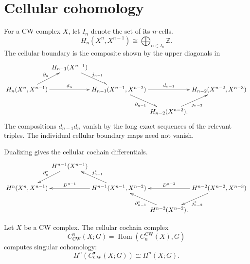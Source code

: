 \section{Cellular cohomology}
\label{at-section-cellular-cohomology}

\noindent
For a CW complex $X$,
let $I_n$ denote the set of its $n$-cells.
$$
H_n(X^n,X^{n-1})
\cong
\bigoplus_{\alpha\in I_n}\mathbb{Z}.
$$
The cellular boundary
is the composite shown by the upper
diagonals in
{\small
$$
\xymatrix@C=0em@R=1.8em{
  & H_{n-1}(X^{n-1})
    \ar[rd]^{j_{n-1}} \\
H_n(X^n,X^{n-1})
  \ar[ru]^{\partial_n}
  \ar[rr]^-{d_n}
  & & H_{n-1}(X^{n-1},X^{n-2})
      \ar[rd]_{\partial_{n-1}}
      \ar[rr]^-{d_{n-1}}
  & & H_{n-2}(X^{n-2},X^{n-3}) \\
  & & & H_{n-2}(X^{n-2})
          \ar[ru]_{j_{n-2}}.
}
$$
}
The compositions $d_{n-1}d_n$ vanish by
the long exact sequences of the relevant
triples.  The individual cellular boundary
maps need not vanish.

\noindent
Dualizing gives the cellular cochain
differentials.
{\small
$$
\xymatrix@C=0em@R=1.8em{
  & H^{n-1}(X^{n-1})
    \ar[ld]_{\partial_n^*} \\
H^n(X^n,X^{n-1})
  & & H^{n-1}(X^{n-1},X^{n-2})
      \ar[ll]_-{D^{n-1}}
      \ar[lu]_{j_{n-1}^*}
  & & H^{n-2}(X^{n-2},X^{n-3})
      \ar[ll]_-{D^{n-2}}
      \ar[ld]^{j_{n-2}^*} \\
  & & & H^{n-2}(X^{n-2})
          \ar[lu]^{\partial_{n-1}^*}.
}
$$
}

\begin{proposition}
\label{at-proposition-cellular-cohomology}
Let $X$ be a CW complex.  The cellular
cochain complex
$$
C^n_{\mathrm{CW}}(X;G)
=
\operatorname{Hom}
(C_n^{\mathrm{CW}}(X),G)
$$
computes singular cohomology:
$$
H^n(C^\bullet_{\mathrm{CW}}(X;G))
\cong H^n(X;G).
$$
\end{proposition}


